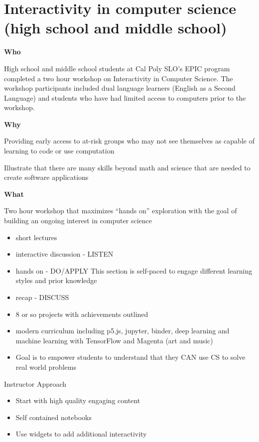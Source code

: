\documentclass[]{book}
\providecommand{\tightlist}{%
  \setlength{\itemsep}{0pt}\setlength{\parskip}{0pt}}
\begin{document}
\section{Interactivity in computer science (high school and middle
school)}\label{interactivity-in-computer-science-high-school-and-middle-school}

\textbf{Who}

High school and middle school students at Cal Poly SLO's EPIC program
completed a two hour workshop on Interactivity in Computer Science. The
workshop participants included dual language learners (English as a
Second Language) and students who have had limited access to computers
prior to the workshop.

\textbf{Why}

Providing early access to at-risk groups who may not see themselves as
capable of learning to code or use computation

Illustrate that there are many skills beyond math and science that are
needed to create software applications

\textbf{What}

Two hour workshop that maximizes ``hands on'' exploration with the goal
of building an ongoing interest in computer science

\begin{itemize}
\tightlist
\item
  short lectures
\item
  interactive discussion - LISTEN
\item
  hands on - DO/APPLY This section is self-paced to engage different
  learning styles and prior knowledge
\item
  recap - DISCUSS
\item
  8 or so projects with achievements outlined
\item
  modern curriculum including p5.js, jupyter, binder, deep learning and
  machine learning with TensorFlow and Magenta (art and music)
\item
  Goal is to empower students to understand that they CAN use CS to
  solve real world problems
\end{itemize}

Instructor Approach

\begin{itemize}
\tightlist
\item
  Start with high quality engaging content
\item
  Self contained notebooks
\item
  Use widgets to add additional interactivity
\end{itemize}
\end{document}
